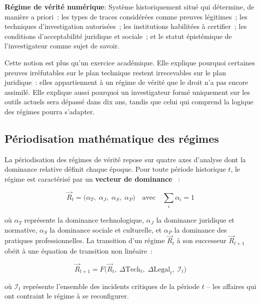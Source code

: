 \begin{boxdef}
\textbf{Régime de vérité numérique}: Système
historiquement situé qui détermine, de manière a priori~: les types de
traces considérées comme preuves légitimes~; les techniques d'investigation
autorisées~; les institutions habilitées à certifier~; les conditions
d'acceptabilité juridique et sociale~; et le statut épistémique de
l'investigateur comme sujet de savoir.
\end{boxdef}

Cette notion est plus qu'un exercice académique. Elle explique pourquoi
certaines preuves irréfutables sur le plan technique restent irrecevables
sur le plan juridique~: elles appartiennent à un régime de vérité que le
droit n'a pas encore assimilé. Elle explique aussi pourquoi un investigateur
formé uniquement sur les outils actuels sera dépassé dans dix ans, tandis
que celui qui comprend la logique des régimes pourra s'adapter.

\subsection{Périodisation mathématique des régimes}

La périodisation des régimes de vérité repose sur quatre axes d'analyse
dont la dominance relative définit chaque époque. Pour toute période
historique $t$, le régime est caractérisé par un \textbf{vecteur de
dominance} \cite{minka2025cro}~:

\begin{equation}
\vec{R}_t = \bigl(\alpha_T,\; \alpha_J,\; \alpha_S,\; \alpha_P\bigr)
\quad \text{avec} \quad \sum_{i} \alpha_i = 1
\label{eq:vecteur-regime}
\end{equation}

où $\alpha_T$ représente la dominance technologique, $\alpha_J$ la
dominance juridique et normative, $\alpha_S$ la dominance sociale et
culturelle, et $\alpha_P$ la dominance des pratiques professionnelles.
La transition d'un régime $\vec{R}_t$ à son successeur $\vec{R}_{t+1}$
obéit à une équation de transition non linéaire~:

\begin{equation}
\vec{R}_{t+1} = F\bigl(\vec{R}_t,\; \Delta\mathrm{Tech}_t,\;
\Delta\mathrm{Legal}_t,\; \mathcal{I}_t\bigr)
\label{eq:transition}
\end{equation}

où $\mathcal{I}_t$ représente l'ensemble des incidents critiques de la
période $t$ -- les affaires qui ont contraint le régime à se reconfigurer.


